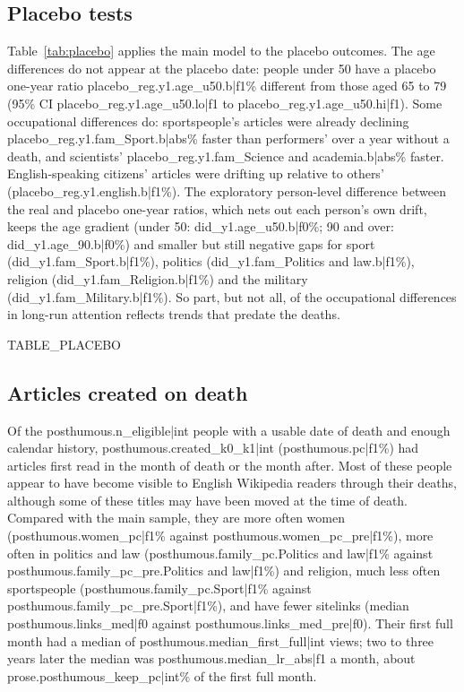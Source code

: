 \documentclass[11pt,a4paper]{article}
\begin{document}
\subsection{Placebo tests}
Table~\ref{tab:placebo} applies the main model to the placebo outcomes. The age differences do not appear at the placebo date: people under 50 have a placebo one-year ratio {{placebo_reg.y1.age_u50.b|f1}}\% different from those aged 65 to 79 (95\% CI {{placebo_reg.y1.age_u50.lo|f1}} to {{placebo_reg.y1.age_u50.hi|f1}}). Some occupational differences do: sportspeople's articles were already declining {{placebo_reg.y1.fam_Sport.b|abs}}\% faster than performers' over a year without a death, and scientists' {{placebo_reg.y1.fam_Science and academia.b|abs}}\% faster. English-speaking citizens' articles were drifting up relative to others' ({{placebo_reg.y1.english.b|f1}}\%). The exploratory person-level difference between the real and placebo one-year ratios, which nets out each person's own drift, keeps the age gradient (under 50: {{did_y1.age_u50.b|f0}}\%; 90 and over: {{did_y1.age_90.b|f0}}\%) and smaller but still negative gaps for sport ({{did_y1.fam_Sport.b|f1}}\%), politics ({{did_y1.fam_Politics and law.b|f1}}\%), religion ({{did_y1.fam_Religion.b|f1}}\%) and the military ({{did_y1.fam_Military.b|f1}}\%). So part, but not all, of the occupational differences in long-run attention reflects trends that predate the deaths.

{{TABLE_PLACEBO}}

\subsection{Articles created on death}\label{sec:posthumous}
Of the {{posthumous.n_eligible|int}} people with a usable date of death and enough calendar history, {{posthumous.created_k0_k1|int}} ({{posthumous.pc|f1}}\%) had articles first read in the month of death or the month after. Most of these people appear to have become visible to English Wikipedia readers through their deaths, although some of these titles may have been moved at the time of death. Compared with the main sample, they are more often women ({{posthumous.women_pc|f1}}\% against {{posthumous.women_pc_pre|f1}}\%), more often in politics and law ({{posthumous.family_pc.Politics and law|f1}}\% against {{posthumous.family_pc_pre.Politics and law|f1}}\%) and religion, much less often sportspeople ({{posthumous.family_pc.Sport|f1}}\% against {{posthumous.family_pc_pre.Sport|f1}}\%), and have fewer sitelinks (median {{posthumous.links_med|f0}} against {{posthumous.links_med_pre|f0}}). Their first full month had a median of {{posthumous.median_first_full|int}} views; two to three years later the median was {{posthumous.median_lr_abs|f1}} a month, about {{prose.posthumous_keep_pc|int}}\% of the first full month.
\end{document}
